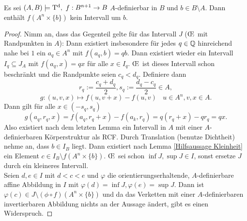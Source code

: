 \begin{lemma}
	Es sei $(A,B)\models\td,\ f:B^{n+1}\rightarrow B$ $A$-definierbar in $B$ und $b\in B\setminus A$. Dann enthält $f(A^n\times\{b\})$ kein Intervall um $b$.
\end{lemma}
\begin{proof}
	Nimm an, dass das Gegenteil gelte für das Intervall $J$ (\OE\ mit Randpunkten in $A$): Dann existiert insbesondere für jedes $q\in\mathbb{Q}$ hinreichend nahe bei $1$ ein $a_q\in A^n$ mit $f(a_q,b)=qb$. Dann existiert wieder ein Intervall $I_q\subseteq J_A$ mit $f(a_q,x)=qx$ für alle $x\in I_q$. \OE\ ist dieses Intervall schon beschränkt und die Randpunkte seien $c_q<d_q$. Definiere dann $$r_q:=\frac{c_q+d_q}{2},s_q:=\frac{d_q-c_q}{2}\in A,$$ $$g:(u,v,x)\mapsto f(u,v+x)-f(u,v)\ \ \ \ u\in A^n,v,x\in A.$$
	Dann gilt für alle $x\in(-s_q,s_q)$ $$g(a_q,r_q,x)=f(a_q,r_q+x)-f(a_k,r_q)=q(r_q+x)-qr_q=qx.$$
	Also existiert nach dem letzten Lemma ein Intervall in $A$ mit einer $A$-definierbaren Körperstruktur als RCF. Durch Translation (benutze Dichtheit) nehme an, dass $b\in I_B$ liegt. Dann existiert nach Lemma \ref{Hilfsaussage Kleinheit} ein Element $c\in I_B\setminus f(A^n\times\{b\})$. \OE\ sei schon $\inf J,\sup J\in I$, sonst ersetze $J$ durch ein kleineres Intervall.\\
	Seien $d,e\in I$ mit $d<c<e$ und $\varphi$ die orientierungserhaltende, $A$-definierbare affine Abbildung in $I$ mit $\varphi(d)=\inf J,\varphi(e)=\sup J$. Dann ist $\varphi(c)\in J\setminus(\phi\circ f)(A^n\times\{b\})$ und da das Verketten mit einer $A$-definierbaren invertierbaren Abbildung nichts an der Aussage ändert, gibt es einen Widerspruch.
\end{proof}

\newpage

